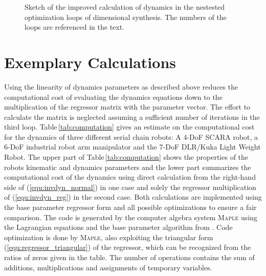 \documentclass{svproc}
\newcommand{\bm}[1]{\boldsymbol{#1}}
\begin{document}
\begin{figure}[tb]
    
    \caption{Sketch of the improved calculation of dynamics in the nestested optimization loops of dimensional synthesis. The numbers of the loops are referenced in the text.}
    \label{fig:dimsynth_dyn_plin}
\end{figure} 




\section{Exemplary Calculations}
\label{sec:Example}

Using the linearity of dynamics parameters as described above reduces the computational cost of evaluating the dynamics equations down to the multiplication of the regressor matrix with the parameter vector.
The effort to calculate the matrix is neglected assuming a sufficient number of iterations in the third loop.
Table\,\ref{tab:computation} gives an estimate on the computational cost for the dynamics of three different serial chain robots: A 4-DoF SCARA robot, a 6-DoF industrial robot arm manipulator and the 7-DoF DLR/Kuka Light Weight Robot.
The upper part of Table\,\ref{tab:computation} shows the properties of the robots kinematic and dynamics parameters and the lower part summarizes the computational cost of the dynamics using direct calculation from the right-hand side of (\ref{equ:invdyn_normal}) in one case and solely the regressor multiplication of (\ref{equ:invdyn_reg}) in the second case.
Both calculations are implemented using the base parameter regressor form and all possible optimizations to ensure a fair comparison.
The code is generated by the computer algebra system \textsc{Maple} using the Lagrangian equations and the base parameter algorithm from \cite{KhalilDom2002}.
Code optimization is done by \textsc{Maple}, also exploiting the triangular form (\ref{equ:regressor_triangular}) of the regressor, which can be recognized from the ratios of zeros given in the table.
The number of operations contains the sum of additions, multiplications and assignments of temporary variables. %
\end{document}
